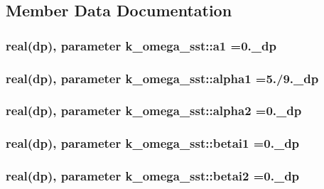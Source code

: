 \subsection{Member Data Documentation}
\hypertarget{classk__omega__sst_adbe032a94c6ae8046be321a1d8cbf42a}{
\subsubsection[{a1}]{\setlength{\rightskip}{0pt plus 5cm}real(dp), parameter k\-\_\-omega\-\_\-sst\-::a1 =0.\-\_\-dp}}\label{classk__omega__sst_adbe032a94c6ae8046be321a1d8cbf42a}
\hypertarget{classk__omega__sst_a6ffaa5ad5ebaed915c79cc4a66d3db02}{
\subsubsection[{alpha1}]{\setlength{\rightskip}{0pt plus 5cm}real(dp), parameter k\-\_\-omega\-\_\-sst\-::alpha1 =5./9.\-\_\-dp}}\label{classk__omega__sst_a6ffaa5ad5ebaed915c79cc4a66d3db02}
\hypertarget{classk__omega__sst_a33436fc9710954a3f0db2ba17777bb85}{
\subsubsection[{alpha2}]{\setlength{\rightskip}{0pt plus 5cm}real(dp), parameter k\-\_\-omega\-\_\-sst\-::alpha2 =0.\-\_\-dp}}\label{classk__omega__sst_a33436fc9710954a3f0db2ba17777bb85}
\hypertarget{classk__omega__sst_abccf6e91f0767a91ea49dbe9024e6f2f}{
\subsubsection[{betai1}]{\setlength{\rightskip}{0pt plus 5cm}real(dp), parameter k\-\_\-omega\-\_\-sst\-::betai1 =0.\-\_\-dp}}\label{classk__omega__sst_abccf6e91f0767a91ea49dbe9024e6f2f}
\hypertarget{classk__omega__sst_ac7304204ed3aa2940a1ece2f12f7e3cb}{
\subsubsection[{betai2}]{\setlength{\rightskip}{0pt plus 5cm}real(dp), parameter k\-\_\-omega\-\_\-sst\-::betai2 =0.\-\_\-dp}}\label{classk__omega__sst_ac7304204ed3aa2940a1ece2f12f7e3cb}
